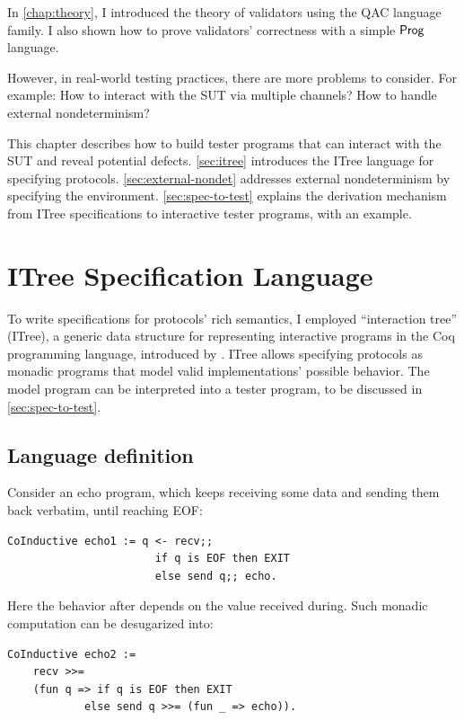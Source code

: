 In \autoref{chap:theory}, I introduced the theory of validators using the QAC
language family.  I also shown how to prove validators' correctness with a
simple $\mathsf{Prog}$ language.

However, in real-world testing practices, there are more problems to consider.
For example: How to interact with the SUT via multiple channels?  How to handle
external nondeterminism?

This chapter describes how to build tester programs that can interact with the
SUT and reveal potential defects.  \autoref{sec:itree} introduces the ITree
language for specifying protocols.  \autoref{sec:external-nondet} addresses
external nondeterminism by specifying the environment.
\autoref{sec:spec-to-test} explains the derivation mechanism from ITree
specifications to interactive tester programs, with an \http example.

\section{ITree Specification Language}
\label{sec:itree}
To write specifications for protocols' rich semantics, I employed ``interaction
tree'' (ITree), a generic data structure for representing interactive programs
in the Coq programming language, introduced by \textcite{itree}.  ITree allows
specifying protocols as monadic programs that model valid implementations'
possible behavior.  The model program can be interpreted into a tester program,
to be discussed in \autoref{sec:spec-to-test}.

\subsection{Language definition}
Consider an echo program, which keeps receiving some data and sending them back
verbatim, until reaching EOF:
\begin{lstlisting}[style=customcoq]
  CoInductive echo1 := q <- recv;;
                       if q is EOF then EXIT
                       else send q;; echo.
\end{lstlisting}

Here the behavior after  depends on the value received during.  Such
monadic computation can be desugarized into:
\begin{lstlisting}[style=customcoq]
  CoInductive echo2 :=
    recv >>=
    (fun q => if q is EOF then EXIT
            else send q >>= (fun _ => echo)).
\end{lstlisting}

